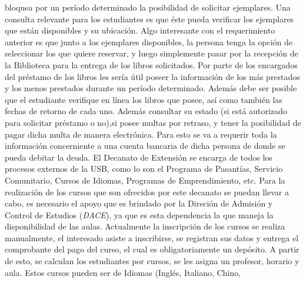 \documentclass[12pt,a4paper,spanish]{article}
\begin{document}
bloquea por un per\'iodo determinado la posibilidad de solicitar ejemplares.   
\newline
\newline
\indent Una consulta relevante para los estudiantes es que \'este
 pueda verificar los ejemplares que est\'an disponibles y su
ubicaci\'on. Algo interesante con el requerimiento anterior es
que junto a los ejemplares disponibles, la persona tenga la opci\'on
de seleccionar los que quiere reservar, y luego simplemente pasar por
la recepci\'on de la Biblioteca para la entrega de los libros
solicitados.
\newline
\newline
\indent Por parte de los encargados del pr\'estamo de los libros
les ser\'ia \'util poseer la informaci\'on de los
m\'as prestados y los menos prestados durante un per\'iodo
determinado. 
\newline
\newline
\indent Adem\'as debe ser posible que el estudiante
verifique en l\'inea los libros que posee, as\'i como tambi\'en las fechas
de retorno de cada uno. Adem\'as consultar su estado (si est\'a autorizado para solicitar pr\'estamo
o no),si posee multas por retraso, y tener la posibilidad de pagar
dicha multa de manera electr\'onica. Para esto se va a requerir toda la
informaci\'on concerniente a una cuenta bancaria de dicha persona de
donde se pueda debitar la deuda.
\newline
\newline
\indent El Decanato de Extensi\'on se encarga de todos los procesos
externos de la USB, como lo son el Programa de Pasant\'ias, Servicio
Comunitario, Cursos de Idiomas, Programas de Emprendimiento, etc. Para
la realizaci\'on de los cursos que son ofrecidos por este decanato se
puedan llevar a cabo, es necesario el apoyo que es brindado por la
Direci\'on de Admisi\'on y Control de Estudios (\emph{DACE}), ya que
es esta dependencia la que maneja la
disponibilidad de las aulas. 
\newline
\newline
\indent Actualmente la inscripci\'on de los cursos se realiza
manualmente, el interesado asiste a inscribirse, se registran sus datos
y entrega el comprobante del pago del curso, el cual es obligatoriamente un
dep\'osito. A partir de esto, se calculan los estudiantes por
cursos, se les asigna un profesor, horario y aula.
\newline
\newline
\indent Estos cursos pueden ser de Idiomas (Ingl\'es, Italiano, Chino,
\end{document}
